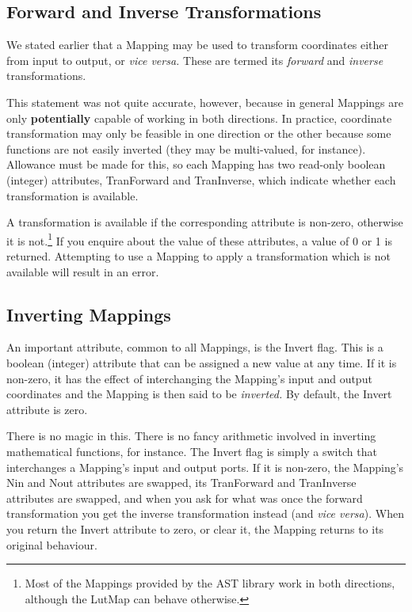 \documentclass[twoside,11pt]{article}
\begin{document}
\subsection{Forward and Inverse Transformations}

We stated earlier that a Mapping may be used to transform coordinates
either from input to output, or {\em{vice versa.}} These are termed
its {\em{forward}} and {\em{inverse}} transformations.

This statement was not quite accurate, however, because in general
Mappings are only {\bf{potentially}} capable of working in both
directions. In practice, coordinate transformation may only be
feasible in one direction or the other because some functions are not
easily inverted (they may be multi-valued, for instance). Allowance
must be made for this, so each Mapping has two read-only boolean
(integer) attributes, TranForward and TranInverse, which indicate
whether each transformation is available.

A transformation is available if the corresponding attribute is
non-zero, otherwise it is not.\footnote{Most of the Mappings provided
by the AST library work in both directions, although the LutMap can
behave otherwise.} If you enquire about the value of these attributes,
a value of 0 or 1 is returned.  Attempting to use a Mapping to apply a
transformation which is not available will result in an error.

\subsection{\label{ss:invertingmappings}Inverting Mappings}

An important attribute, common to all Mappings, is the Invert
flag. This is a boolean (integer) attribute that can be assigned a new
value at any time. If it is non-zero, it has the effect of
interchanging the Mapping's input and output coordinates and the
Mapping is then said to be {\em{inverted.}} By default, the Invert
attribute is zero.

There is no magic in this. There is no fancy arithmetic involved in
inverting mathematical functions, for instance. The Invert flag is
simply a switch that interchanges a Mapping's input and output
ports. If it is non-zero, the Mapping's Nin and Nout attributes are
swapped, its TranForward and TranInverse attributes are swapped, and
when you ask for what was once the forward transformation you get the
inverse transformation instead (and {\em{vice versa}}). When you
return the Invert attribute to zero, or clear it, the Mapping returns
to its original behaviour.
\end{document}
